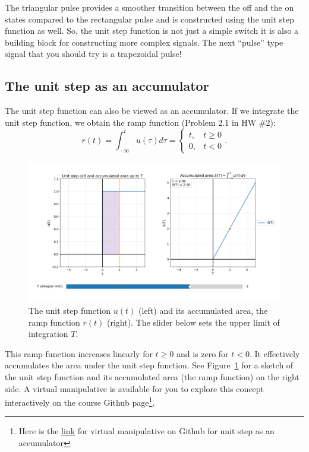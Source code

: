 \documentclass{ee102_notes}
\begin{document}
The triangular pulse provides a smoother transition between the off and the on states compared to the rectangular pulse and is constructed using the unit step function as well. So, the unit step function is not just a simple switch it is also a building block for constructing more complex signals. The next ``pulse'' type signal that you should try is a trapezoidal pulse!
\subsection{The unit step as an accumulator}
The unit step function can also be viewed as an accumulator. If we integrate the unit step function, we obtain the ramp function (Problem 2.1 in HW \#2):
\[
r(t) = \int_{-\infty}^{t} u(\tau) d\tau = \begin{cases}
t, & t \geq 0 \\
0, & t < 0
\end{cases}.
\]
\begin{figure}[t!]
    \centering
    \includegraphics[width=\textwidth]{figs/unit_step_accumulator.png}
    \caption{The unit step function $u(t)$ (left) and its accumulated area, the ramp function $r(t)$ (right). The slider below sets the upper limit of integration $T$.}
    \label{fig:unit_accumulator}
\end{figure}
This ramp function increases linearly for $t \geq 0$ and is zero for $t < 0$. It effectively accumulates the area under the unit step function. See Figure~\ref{fig:unit_accumulator} for a sketch of the unit step function and its accumulated area (the ramp function) on the right side. A virtual manipulative is available for you to explore this concept interactively on the course Github page\footnote{Here is the \href{https://github.com/ee-ucmerced/ee102-signals-systems/tree/main/lecture\_notes/week2\_signal\_properties/VM\_unit\_step\_accumulator.py}{link} for virtual manipulative on Github for unit step as an accumulator}.
\end{document}
